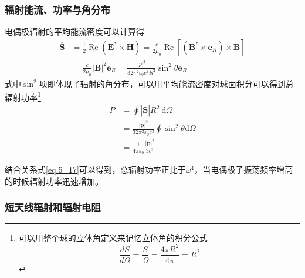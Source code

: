         \subsubsection{辐射能流、功率与角分布}
            电偶极辐射的平均能流密度可以计算得
            \begin{equation}
                \begin{aligned}
                \overline{\boldsymbol{S}} &=\frac{1}{2} \operatorname{Re}\left(\boldsymbol{E}^{*} \times \boldsymbol{H}\right)=\frac{c}{2 \mu_{0}} \operatorname{Re}\left[\left(\boldsymbol{B}^{*} \times \boldsymbol{e}_{R}\right) \times \boldsymbol{B}\right] \\
                &=\frac{c}{2 \mu_{0}}|\boldsymbol{B}|^{2} \boldsymbol{e}_{R}=\frac{|\ddot{p}|^{2}}{32 \pi^{2} \varepsilon_{0} c^{3} R^{2}} \sin ^{2} \theta \boldsymbol{e}_{R} 
                \end{aligned}
                \end{equation}
            式中$\sin^2$项即体现了辐射的角分布，可以用平均能流密度对球面积分可以得到总辐射功率\footnote{可以用整个球的立体角定义来记忆立体角的积分公式\[\frac{d S}{d\Omega}=\frac{S}{\Omega}=\frac{4 \pi R^2}{4 \pi}=R^2\]}
            \begin{equation}
                \begin{aligned}
                P &=\oint|\overline{\boldsymbol{S}}| R^{2} \mathrm{~d} \Omega \\
                &=\frac{|\ddot{\boldsymbol{p}}|^{2}}{32 \pi^{2} \varepsilon_{0} c^{3}} \oint \sin ^{2} \theta \mathrm{d} \Omega \\
                &=\frac{1}{4 \pi \varepsilon_{0}} \frac{|\ddot{\boldsymbol{p}}|^{2}}{3 c^{3}}
                \end{aligned}
            \end{equation}
            
            结合关系式\ref{eq.5_17}可以得到，总辐射功率正比于$\omega^4$，当电偶极子振荡频率增高的时候辐射功率迅速增加。
        
        \subsubsection{短天线辐射和辐射电阻}
